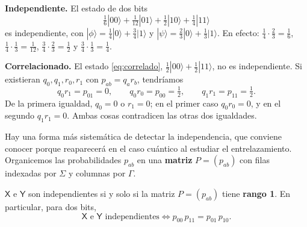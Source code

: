 \documentclass[11pt, a4paper, twoside, openright]{report}
\begin{document}
\begin{tcolorbox}[colback=cyan!5!white,colframe=cyan!75!black,title=\textbf{Ejemplo: Un estado independiente y uno correlacionado}]
\textbf{Independiente.} El estado de dos bits
\[ \tfrac16|00\rangle + \tfrac{1}{12}|01\rangle + \tfrac12|10\rangle + \tfrac14|11\rangle \]
es independiente, con $|\phi\rangle = \frac14|0\rangle + \frac34|1\rangle$ y $|\psi\rangle = \frac23|0\rangle + \frac13|1\rangle$. En efecto: $\frac14\cdot\frac23 = \frac16$, $\frac14\cdot\frac13 = \frac1{12}$, $\frac34\cdot\frac23 = \frac12$ y $\frac34\cdot\frac13 = \frac14$.

\textbf{Correlacionado.} El estado \eqref{eq:correlado}, $\frac12|00\rangle + \frac12|11\rangle$, no es independiente. Si existieran $q_0, q_1, r_0, r_1$ con $p_{ab} = q_a r_b$, tendríamos
\[ q_0 r_1 = p_{01} = 0, \qquad q_0 r_0 = p_{00} = \tfrac12, \qquad q_1 r_1 = p_{11} = \tfrac12. \]
De la primera igualdad, $q_0 = 0$ o $r_1 = 0$; en el primer caso $q_0 r_0 = 0$, y en el segundo $q_1 r_1 = 0$. Ambas cosas contradicen las otras dos igualdades.
\end{tcolorbox}

\noindent Hay una forma más sistemática de detectar la independencia, que conviene conocer porque reaparecerá en el caso cuántico al estudiar el entrelazamiento. Organicemos las probabilidades $p_{ab}$ en una \textbf{matriz} $P = (p_{ab})$ con filas indexadas por $\Sigma$ y columnas por $\Gamma$.

\begin{tcolorbox}[colback=teal!5!white,colframe=teal!75!black,title=\textbf{Proposición: Criterio del rango}]
$\mathsf{X}$ e $\mathsf{Y}$ son independientes si y solo si la matriz $P = (p_{ab})$ tiene \textbf{rango 1}. En particular, para dos bits,
\[ \mathsf{X} \text{ e } \mathsf{Y} \text{ independientes} \iff p_{00}\,p_{11} = p_{01}\,p_{10}. \]
\end{tcolorbox}
\end{document}
